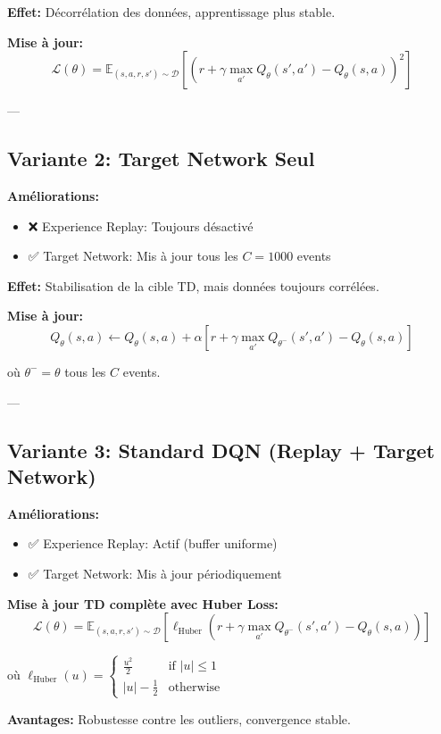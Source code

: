 \textbf{Effet:} Décorrélation des données, apprentissage plus stable.

\textbf{Mise à jour:}
\[
\mathcal{L}(\theta) = \mathbb{E}_{(s,a,r,s') \sim \mathcal{D}}
\left[ (r + \gamma \max_{a'} Q_\theta(s', a') - Q_\theta(s,a))^2 \right]
\]

---

\subsection{Variante 2: Target Network Seul}

\textbf{Améliorations:}
\begin{itemize}
    \item ❌ Experience Replay: Toujours désactivé
    \item ✅ Target Network: Mis à jour tous les $C=1000$ events
\end{itemize}

\textbf{Effet:} Stabilisation de la cible TD, mais données toujours corrélées.

\textbf{Mise à jour:}
\[
Q_\theta(s,a) \leftarrow Q_\theta(s,a) + \alpha [r + \gamma \max_{a'} Q_{\theta^-}(s', a') - Q_\theta(s,a)]
\]

où $\theta^- = \theta$ tous les $C$ events.

---

\subsection{Variante 3: Standard DQN (Replay + Target Network)}

\textbf{Améliorations:}
\begin{itemize}
    \item ✅ Experience Replay: Actif (buffer uniforme)
    \item ✅ Target Network: Mis à jour périodiquement
\end{itemize}

\textbf{Mise à jour TD complète avec Huber Loss:}
\[
\mathcal{L}(\theta) = \mathbb{E}_{(s,a,r,s') \sim \mathcal{D}}
\left[ \ell_{\text{Huber}}(r + \gamma \max_{a'} Q_{\theta^-}(s', a') - Q_\theta(s,a)) \right]
\]

où $\ell_{\text{Huber}}(u) = \begin{cases} \frac{u^2}{2} & \text{if } |u| \leq 1 \\ |u| - \frac{1}{2} & \text{otherwise} \end{cases}$

\textbf{Avantages:} Robustesse contre les outliers, convergence stable.

